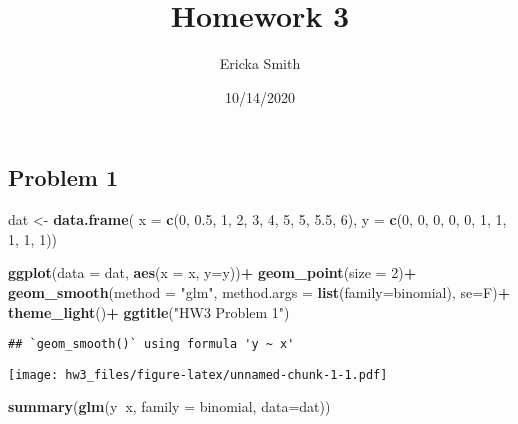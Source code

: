 \documentclass[
]{article}
\title{Homework 3}
\author{Ericka Smith}
\date{10/14/2020}
\newenvironment{Shaded}{\begin{snugshade}}{\end{snugshade}}
\newcommand{\DataTypeTok}[1]{\textcolor[rgb]{0.13,0.29,0.53}{#1}}
\newcommand{\DecValTok}[1]{\textcolor[rgb]{0.00,0.00,0.81}{#1}}
\newcommand{\FloatTok}[1]{\textcolor[rgb]{0.00,0.00,0.81}{#1}}
\newcommand{\KeywordTok}[1]{\textcolor[rgb]{0.13,0.29,0.53}{\textbf{#1}}}
\newcommand{\NormalTok}[1]{#1}
\newcommand{\OperatorTok}[1]{\textcolor[rgb]{0.81,0.36,0.00}{\textbf{#1}}}
\newcommand{\StringTok}[1]{\textcolor[rgb]{0.31,0.60,0.02}{#1}}
\begin{document}
\maketitle

\hypertarget{problem-1}{%
\subsection{Problem 1}\label{problem-1}}

\begin{Shaded}
\begin{Highlighting}[]
\NormalTok{dat <-}\StringTok{ }\KeywordTok{data.frame}\NormalTok{(}
  \DataTypeTok{x =} \KeywordTok{c}\NormalTok{(}\DecValTok{0}\NormalTok{, }\FloatTok{0.5}\NormalTok{, }\DecValTok{1}\NormalTok{, }\DecValTok{2}\NormalTok{, }\DecValTok{3}\NormalTok{, }\DecValTok{4}\NormalTok{, }\DecValTok{5}\NormalTok{, }\DecValTok{5}\NormalTok{, }\FloatTok{5.5}\NormalTok{, }\DecValTok{6}\NormalTok{),}
  \DataTypeTok{y =} \KeywordTok{c}\NormalTok{(}\DecValTok{0}\NormalTok{, }\DecValTok{0}\NormalTok{, }\DecValTok{0}\NormalTok{, }\DecValTok{0}\NormalTok{, }\DecValTok{0}\NormalTok{, }\DecValTok{1}\NormalTok{, }\DecValTok{1}\NormalTok{, }\DecValTok{1}\NormalTok{, }\DecValTok{1}\NormalTok{, }\DecValTok{1}\NormalTok{))}

\KeywordTok{ggplot}\NormalTok{(}\DataTypeTok{data =}\NormalTok{ dat, }\KeywordTok{aes}\NormalTok{(}\DataTypeTok{x =}\NormalTok{ x, }\DataTypeTok{y=}\NormalTok{y))}\OperatorTok{+}
\StringTok{  }\KeywordTok{geom_point}\NormalTok{(}\DataTypeTok{size =} \DecValTok{2}\NormalTok{)}\OperatorTok{+}
\StringTok{  }\KeywordTok{geom_smooth}\NormalTok{(}\DataTypeTok{method =} \StringTok{"glm"}\NormalTok{, }\DataTypeTok{method.args =} \KeywordTok{list}\NormalTok{(}\DataTypeTok{family=}\NormalTok{binomial), }\DataTypeTok{se=}\NormalTok{F)}\OperatorTok{+}
\StringTok{  }\KeywordTok{theme_light}\NormalTok{()}\OperatorTok{+}
\StringTok{  }\KeywordTok{ggtitle}\NormalTok{(}\StringTok{"HW3 Problem 1"}\NormalTok{)}
\end{Highlighting}
\end{Shaded}

\begin{verbatim}
## `geom_smooth()` using formula 'y ~ x'
\end{verbatim}

\texttt{[image: hw3\_files/figure-latex/unnamed-chunk-1-1.pdf]}

\begin{Shaded}
\begin{Highlighting}[]
\KeywordTok{summary}\NormalTok{(}\KeywordTok{glm}\NormalTok{(y}\OperatorTok{~}\NormalTok{x, }\DataTypeTok{family =}\NormalTok{ binomial, }\DataTypeTok{data=}\NormalTok{dat))}
\end{Highlighting}
\end{Shaded}
\end{document}
